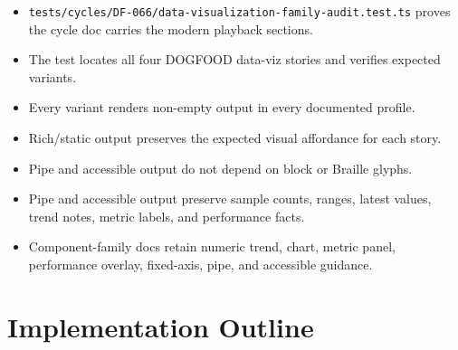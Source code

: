 \begin{itemize}
\tightlist
\item
  \texttt{t\allowbreak{}e\allowbreak{}s\allowbreak{}t\allowbreak{}s\allowbreak{}/\allowbreak{}c\allowbreak{}y\allowbreak{}c\allowbreak{}l\allowbreak{}e\allowbreak{}s\allowbreak{}/\allowbreak{}D\allowbreak{}F\allowbreak{}-\allowbreak{}0\allowbreak{}6\allowbreak{}6\allowbreak{}/\allowbreak{}d\allowbreak{}a\allowbreak{}t\allowbreak{}a\allowbreak{}-\allowbreak{}v\allowbreak{}i\allowbreak{}s\allowbreak{}u\allowbreak{}a\allowbreak{}l\allowbreak{}i\allowbreak{}z\allowbreak{}a\allowbreak{}t\allowbreak{}i\allowbreak{}o\allowbreak{}n\allowbreak{}-\allowbreak{}f\allowbreak{}a\allowbreak{}m\allowbreak{}i\allowbreak{}l\allowbreak{}y\allowbreak{}-\allowbreak{}a\allowbreak{}u\allowbreak{}d\allowbreak{}i\allowbreak{}t\allowbreak{}.\allowbreak{}t\allowbreak{}e\allowbreak{}s\allowbreak{}t\allowbreak{}.\allowbreak{}t\allowbreak{}s} proves the cycle doc carries the modern playback sections.
\item
  The test locates all four DOGFOOD data-viz stories and verifies expected variants.
\item
  Every variant renders non-empty output in every documented profile.
\item
  Rich/static output preserves the expected visual affordance for each story.
\item
  Pipe and accessible output do not depend on block or Braille glyphs.
\item
  Pipe and accessible output preserve sample counts, ranges, latest values, trend notes, metric labels, and performance facts.
\item
  Component-family docs retain numeric trend, chart, metric panel, performance overlay, fixed-axis, pipe, and accessible guidance.
\end{itemize}

\section{Implementation Outline}\label{record-107-implementation-outline}

